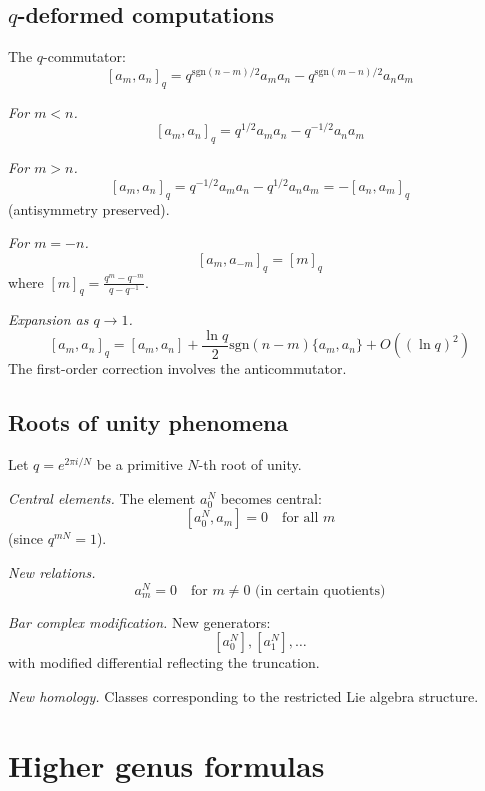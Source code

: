 \subsection{\texorpdfstring{$q$-deformed computations}{q-deformed computations}}\label{sec:q-deformed-details}

\begin{computation}\label{comp:q-comm}
The $q$-commutator:
\[
[a_m, a_n]_q = q^{\mathrm{sgn}(n-m)/2} a_m a_n - q^{\mathrm{sgn}(m-n)/2} a_n a_m
\]

\emph{For $m < n$.}
\[
[a_m, a_n]_q = q^{1/2} a_m a_n - q^{-1/2} a_n a_m
\]

\emph{For $m > n$.}
\[
[a_m, a_n]_q = q^{-1/2} a_m a_n - q^{1/2} a_n a_m = -[a_n, a_m]_q
\]
(antisymmetry preserved).

\emph{For $m = -n$.}
\[
[a_m, a_{-m}]_q = [m]_q
\]
where $[m]_q = \frac{q^m - q^{-m}}{q - q^{-1}}$.

\emph{Expansion as $q \to 1$.}
\[
[a_m, a_n]_q = [a_m, a_n] + \frac{\ln q}{2}\mathrm{sgn}(n-m)\{a_m, a_n\} + O((\ln q)^2)
\]
The first-order correction involves the anticommutator.
\end{computation}


\subsection{Roots of unity phenomena}

\begin{computation}\label{comp:q-root-unity}
Let $q = e^{2\pi i/N}$ be a primitive $N$-th root of unity.

\emph{Central elements.} The element $a_0^N$ becomes central:
\[
[a_0^N, a_m] = 0 \quad \text{for all } m
\]
(since $q^{mN} = 1$).

\emph{New relations.}
\[
a_m^N = 0 \quad \text{for } m \neq 0 \text{ (in certain quotients)}
\]

\emph{Bar complex modification.} New generators:
\[
[a_0^N], [a_1^N], \ldots
\]
with modified differential reflecting the truncation.

\emph{New homology.} Classes corresponding to the restricted Lie algebra structure.
\end{computation}


\section{Higher genus formulas}
\label{sec:higher-genus-details}

